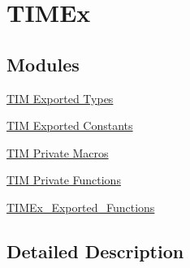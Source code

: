 \hypertarget{group___t_i_m_ex}{}\section{T\+I\+M\+Ex}
\label{group___t_i_m_ex}
\subsection*{Modules}
\begin{DoxyCompactItemize}
\item 
\hyperlink{group___t_i_m_ex___exported___types}{T\+I\+M Exported Types}
\item 
\hyperlink{group___t_i_m_ex___exported___constants}{T\+I\+M Exported Constants}
\item 
\hyperlink{group___t_i_m_ex___private___macros}{T\+I\+M Private Macros}
\item 
\hyperlink{group___t_i_m_ex___private___functions}{T\+I\+M Private Functions}
\item 
\hyperlink{group___t_i_m_ex___exported___functions}{T\+I\+M\+Ex\+\_\+\+Exported\+\_\+\+Functions}
\end{DoxyCompactItemize}


\subsection{Detailed Description}
